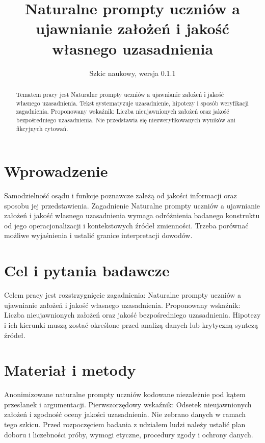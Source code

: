 \documentclass[11pt,a4paper]{article}
\title{Naturalne prompty uczniów a ujawnianie założeń i jakość własnego uzasadnienia}
\author{}
\date{Szkic naukowy, wersja 0.1.1}
\begin{document}
\maketitle

\begin{abstract}

Tematem pracy jest Naturalne prompty uczniów a ujawnianie założeń i jakość własnego uzasadnienia. Tekst systematyzuje uzasadnienie, hipotezy i sposób weryfikacji zagadnienia. Proponowany wskaźnik: Liczba nieujawnionych założeń oraz jakość bezpośredniego uzasadnienia. Nie przedstawia się niezweryfikowanych wyników ani fikcyjnych cytowań.

\end{abstract}

\section{Wprowadzenie}

Samodzielność osądu i funkcje poznawcze zależą od jakości informacji oraz sposobu jej przedstawienia. Zagadnienie Naturalne prompty uczniów a ujawnianie założeń i jakość własnego uzasadnienia wymaga odróżnienia badanego konstruktu od jego operacjonalizacji i kontekstowych źródeł zmienności. Trzeba porównać możliwe wyjaśnienia i ustalić granice interpretacji dowodów.

\section{Cel i pytania badawcze}

Celem pracy jest rozstrzygnięcie zagadnienia: Naturalne prompty uczniów a ujawnianie założeń i jakość własnego uzasadnienia. Proponowany wskaźnik: Liczba nieujawnionych założeń oraz jakość bezpośredniego uzasadnienia. Hipotezy i ich kierunki muszą zostać określone przed analizą danych lub krytyczną syntezą źródeł.

\section{Materiał i metody}

Anonimizowane naturalne prompty uczniów kodowane niezależnie pod kątem przesłanek i argumentacji. Pierwszorzędowy wskaźnik: Odsetek nieujawnionych założeń i zgodność oceny jakości uzasadnienia. Nie zebrano danych w ramach tego szkicu. Przed rozpoczęciem badania z udziałem ludzi należy ustalić plan doboru i liczebności próby, wymogi etyczne, procedury zgody i ochrony danych.
\end{document}

